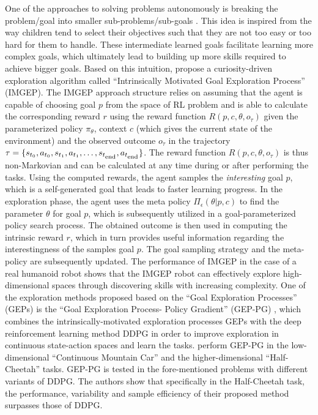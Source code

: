 One of the approaches to solving problems autonomously is breaking the problem/goal into smaller sub-problems/sub-goals . This idea is inspired from the way children tend to select their objectives such that they are not too easy or too hard for them to handle. These intermediate learned goals facilitate learning more complex goals, which ultimately lead to building up more skills required to achieve bigger goals. Based on this intuition,  propose a curiosity-driven exploration algorithm called ``Intrinsically Motivated Goal Exploration Process'' (IMGEP). The IMGEP approach structure relies on assuming that the agent is capable of choosing goal $p$ from the space of RL problem and is able to calculate the corresponding reward $r$ using the reward function $R\left(p,c,\theta,o_\tau\right)$ given the parameterized policy $\pi_\theta$, context $c$ (which gives the current state of the environment) and the observed outcome $o_\tau$ in the trajectory $\tau=\{ s_{t_0},a_{t_0}, s_{t_1}, a_{t_1},\dots,s_{t_{\mbox{\scriptsize end}}}, a_{t_{\mbox{\scriptsize end}}}\}$. The reward function $R\left(p,c,\theta,o_\tau\right)$ is thus non-Markovian and can be calculated at any time during or after performing the tasks. Using the computed rewards, the agent samples the \emph{interesting} goal $p$, which is a self-generated goal that leads to faster learning progress. In the exploration phase, the agent uses the meta policy $\Pi_\epsilon\left(\theta|p,c\right)$ to find the parameter $\theta$ for goal $p$, which is subsequently utilized in a goal-parameterized policy search process. The obtained outcome is then used in computing the intrinsic reward $r$, which in turn provides useful information regarding the interestingness of the samples goal $p$. The goal sampling strategy and the meta-policy are subsequently updated. The performance of IMGEP in the case of a real humanoid robot shows that the IMGEP robot can effectively explore high-dimensional spaces through discovering skills with increasing complexity. 
One of the exploration methods proposed based on the ``Goal Exploration Processes'' (GEPs)  is the ``Goal Exploration Process- Policy Gradient'' (GEP-PG) , which combines the intrinsically-motivated exploration processes GEPs with the deep reinforcement learning method DDPG in order to improve exploration in continuous state-action spaces and learn the tasks.  perform GEP-PG in the low-dimensional ``Continuous Mountain Car'' and the higher-dimensional ``Half-Cheetah'' tasks. GEP-PG is tested in the fore-mentioned problems with different variants of DDPG. The authors show that specifically in the Half-Cheetah task, the performance, variability and sample efficiency of their proposed method surpasses those of DDPG.

